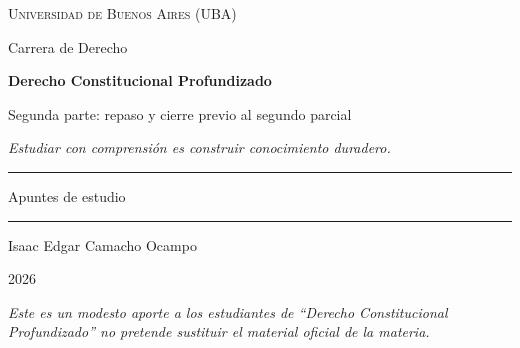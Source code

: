 \documentclass[12pt,oneside]{book}
\newcommand{\universidad}{Universidad de Buenos Aires (UBA)}
\newcommand{\carrera}{Carrera de Derecho}
\newcommand{\materia}{Derecho Constitucional Profundizado}
\newcommand{\subtitulo}{Segunda parte: repaso y cierre previo al segundo parcial}
\newcommand{\autor}{Isaac Edgar Camacho Ocampo}
\newcommand{\anio}{2026}
\begin{document}

\begin{titlepage}

\thispagestyle{empty}

\begin{center}

\vspace*{1cm}

{\large \textsc{\universidad}}

\vspace{0.2cm}

{\large \carrera}

\vspace{3cm}

{\Huge \textbf{\materia}}

\vspace{1cm}

{\LARGE \subtitulo}

\vspace{0.8cm}

\textit{Estudiar con comprensión es construir conocimiento duradero.}

\vspace{1.2cm}

\rule{0.70\textwidth}{0.5pt}

\vspace{0.5cm}

{\large Apuntes de estudio}

\vspace{0.5cm}

\rule{0.70\textwidth}{0.5pt}

\vfill

{\large \autor}

\vspace{0.3cm}

{\large \anio}

\end{center}

\vfill

\begin{flushleft}
\textit{Este es un modesto aporte a los estudiantes de ``\materia'' no pretende sustituir el material oficial de la materia.}
\end{flushleft}

\end{titlepage}
\end{document}
